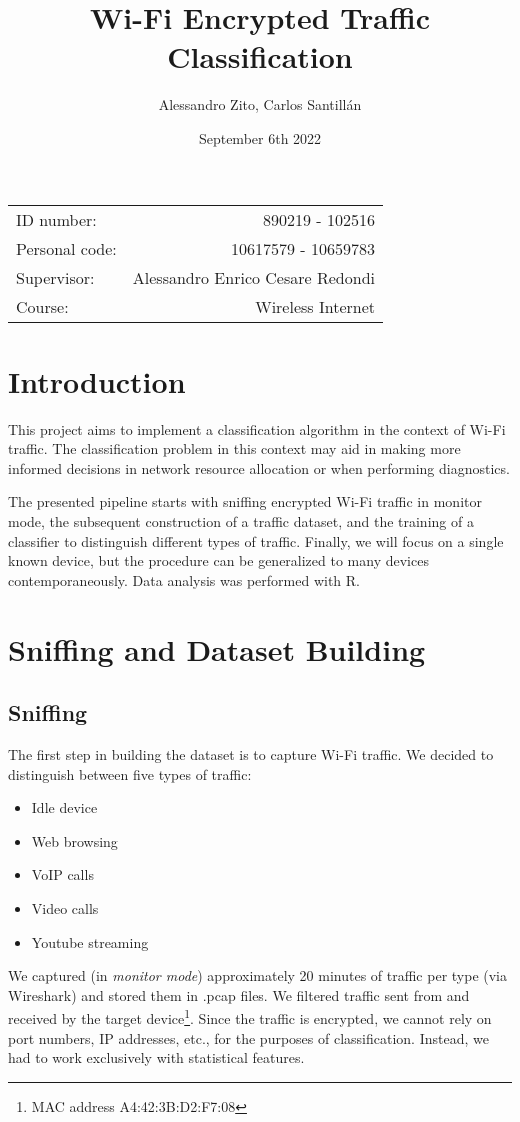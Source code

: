 \documentclass[11pt, USenglish]{article}
\title{Wi-Fi Encrypted Traffic Classification}
\author{Alessandro Zito, Carlos Santillán}
\date{September 6th 2022}
\begin{document}
\maketitle
\begin{center}
\begin{tabular}{l r}
ID number: & 890219 - 102516\\ %
Personal code: & 10617579 - 10659783\\
Supervisor: & Alessandro Enrico Cesare Redondi \\%
Course: & Wireless Internet
\end{tabular}
\end{center}


\newpage

\tableofcontents

\newpage


\section{Introduction}
This project aims to implement a classification algorithm in the context of Wi-Fi traffic. The classification problem in this context may aid in making more informed decisions in network resource allocation or when performing diagnostics.

The presented pipeline starts with sniffing encrypted Wi-Fi traffic in monitor mode, the subsequent construction of a traffic dataset, and the training of a classifier to distinguish different types of traffic. Finally, we will focus on a single known device, but the procedure can be generalized to many devices contemporaneously. Data analysis was performed with R.

\section{Sniffing and Dataset Building}

\subsection{Sniffing}


The first step in building the dataset is to capture Wi-Fi traffic. We decided to distinguish between five types of traffic:
\begin{itemize}
	\itemsep-0.3em 
	\item Idle device
	\item Web browsing
	\item VoIP calls 
	\item Video calls 
	\item Youtube streaming
\end{itemize}
We captured (in \textit{monitor mode}) approximately 20 minutes of traffic per type (via Wireshark) and stored them in .pcap files. We filtered traffic sent from and received by the target device\footnote{MAC address A4:42:3B:D2:F7:08}. Since the traffic is encrypted, we cannot rely on port numbers, IP addresses, etc., for the purposes of classification. Instead, we had to work exclusively with statistical features.
\end{document}
